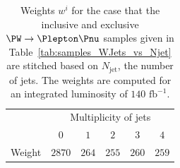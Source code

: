 \documentclass[twocolumn,epjc3]{svjour3}
\newcommand{\jet}{\ensuremath{\textrm{jet}}\xspace}
\newcommand{\fbinv}{\ensuremath{\textrm{~fb}^{-1}}\xspace}
\begin{document}
\begin{table}
\caption{
  Weights $w^{i}$ for the case that the inclusive and exclusive $\PW \to \Plepton\Pnu$ samples 
  given in Table~\ref{tab:samples_WJets_vs_Njet}
  are stitched based on $N_{\jet}$, the number of jets.
  The weights are computed for an integrated luminosity of $140\fbinv$.
}
\label{tab:weights_WJets_vs_Njet}
\begin{center}
\begin{tabular}{l|ccccc}
\hline
 & \multicolumn{5}{c}{Multiplicity of jets} \\
 & $0$ & $1$ & $2$ & $3$ & $4$ \\
\hline
Weight & $2870$ & $264$ & $255$ & $260$ & $259$ \\
\hline
\end{tabular}
\end{center}
\end{table}

\end{document}
